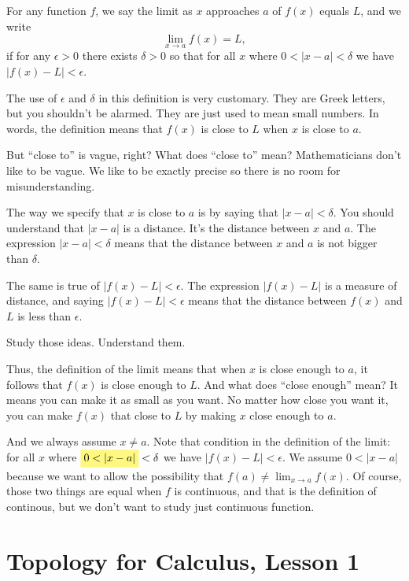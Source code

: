 \documentclass[11pt]{book}
\newcommand{\highlight}[1]{%
  \colorbox{yellow!50}{$\displaystyle#1$}}
\newenvironment{definition}[1][Definition]{\begin{trivlist}
\item[\hskip \labelsep {\bfseries #1}]}{\end{trivlist}}
\numberwithin{example}{chapter}
\begin{document}
\begin{definition}
For any function $f$, we say the limit as $x$ approaches $a$ of $f(x)$ equals $L$, and we write 
$$\lim_{x\to a}f(x)=L,$$ 
if for any $\epsilon>0$ there exists $\delta>0$ so that for all $x$ where $0< |x-a|<\delta$ we have $|f(x)-L|<\epsilon$.  
\end{definition}

The use of $\epsilon$ and $\delta$ in this definition is very customary.  They are Greek letters, but you shouldn't be alarmed.  They are just used to mean small numbers.  In words, the definition means that $f(x)$ is close to $L$ when $x$ is close to $a$.  

But ``close to'' is vague, right?  What does ``close to'' mean?  Mathematicians don't like to be vague.  We like to be exactly precise so there is no room for misunderstanding.  

The way we specify that $x$ is close to $a$ is by saying that $|x-a|<\delta$.  You should understand that $|x-a|$ is a distance.  It's the distance between $x$ and $a$.  The expression $|x-a|<\delta$ means that the distance between $x$ and $a$ is not bigger than $\delta$.  

The same is true of $|f(x)-L|<\epsilon$.  The expression   $|f(x)-L|$ is a measure of distance, and saying $|f(x)-L|<\epsilon$ means that the distance between $f(x)$ and $L$ is less than $\epsilon$.  

Study those ideas. Understand them.  

Thus, the definition of the limit means that when $x$ is close enough to $a$, it follows that $f(x)$ is close enough to $L$.  And what does ``close enough'' mean?  It means you can make it as small as you want.  No matter how close you want it, you can make $f(x)$ that close to $L$ by making $x$ close enough to $a$.  

And we always assume $x\neq a$.  Note that condition in the definition of the limit: for all $x$ where $\highlight{0< |x-a|}<\delta$ we have $|f(x)-L|<\epsilon$.  We assume $0<|x-a|$ because we want to allow the possibility that $f(a)\neq \lim_{x\to a} f(x)$.  Of course, those two things are equal when $f$ is continuous, and that is the definition of continous, but we don't want to study just continuous function.  


\section{Topology for Calculus, Lesson 1}
\end{document}
